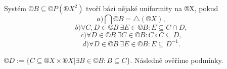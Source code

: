 \documentclass[12pt]{article}                   %
\begin{document}
    \begin{lemma}
        Systém $©B \subseteq ©P(®X^2)$ tvoří bázi nějaké uniformity na ®X, pokud
        $$ a) \bigcap ©B = \triangle(®X), $$ 
        $$ b) \forall C, D \in ©B\ \exists E \in ©B: E \subseteq C \cap D, $$
        $$ c) \forall D \in ©B\ \exists C \in ©B: C \circ C \subseteq D, $$ 
        $$ d) \forall D \in ©B\ \exists E \in ©B: E \subseteq D^{-1}. $$

        \begin{dukazin}
            $©D := \{C \subseteq ®X \times ®X | \exists B \in ©B: B \subseteq C\}$. Následně ověříme podmínky.
        \end{dukazin}
    \end{lemma}
\end{document}
